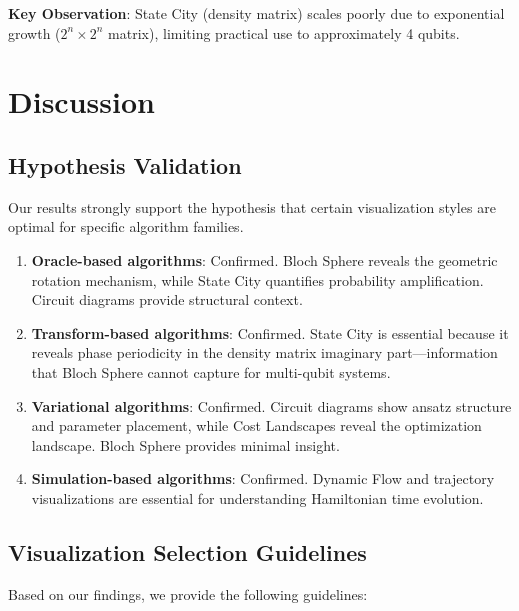 \documentclass[12pt,a4paper]{article}
\begin{document}
\textbf{Key Observation}: State City (density matrix) scales poorly due to exponential growth ($2^n \times 2^n$ matrix), limiting practical use to approximately 4 qubits.

\newpage

\section{Discussion}

\subsection{Hypothesis Validation}

Our results strongly support the hypothesis that certain visualization styles are optimal for specific algorithm families.

\begin{enumerate}
	\item \textbf{Oracle-based algorithms}: Confirmed. Bloch Sphere reveals the geometric rotation mechanism, while State City quantifies probability amplification. Circuit diagrams provide structural context.

	\item \textbf{Transform-based algorithms}: Confirmed. State City is essential because it reveals phase periodicity in the density matrix imaginary part—information that Bloch Sphere cannot capture for multi-qubit systems.

	\item \textbf{Variational algorithms}: Confirmed. Circuit diagrams show ansatz structure and parameter placement, while Cost Landscapes reveal the optimization landscape. Bloch Sphere provides minimal insight.

	\item \textbf{Simulation-based algorithms}: Confirmed. Dynamic Flow and trajectory visualizations are essential for understanding Hamiltonian time evolution.
\end{enumerate}

\subsection{Visualization Selection Guidelines}

Based on our findings, we provide the following guidelines:
\end{document}
